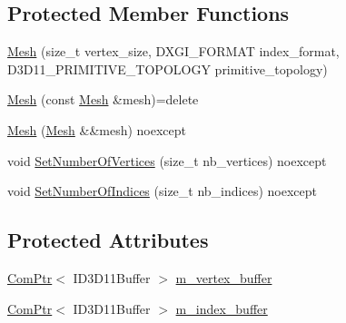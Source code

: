 \subsection*{Protected Member Functions}
\begin{DoxyCompactItemize}
\item 
\hyperlink{classmage_1_1rendering_1_1_mesh_a3113bd0dd48a82ae03e0a07d971494da}{Mesh} (size\+\_\+t vertex\+\_\+size, D\+X\+G\+I\+\_\+\+F\+O\+R\+M\+AT index\+\_\+format, D3\+D11\+\_\+\+P\+R\+I\+M\+I\+T\+I\+V\+E\+\_\+\+T\+O\+P\+O\+L\+O\+GY primitive\+\_\+topology)
\item 
\hyperlink{classmage_1_1rendering_1_1_mesh_a42e4cab2db663fa8d7f2c8651f30894b}{Mesh} (const \hyperlink{classmage_1_1rendering_1_1_mesh}{Mesh} \&mesh)=delete
\item 
\hyperlink{classmage_1_1rendering_1_1_mesh_aeb090ec9531823157f010a70a9dabf45}{Mesh} (\hyperlink{classmage_1_1rendering_1_1_mesh}{Mesh} \&\&mesh) noexcept
\item 
void \hyperlink{classmage_1_1rendering_1_1_mesh_abf2fc84400607b6579028eff66eb179e}{Set\+Number\+Of\+Vertices} (size\+\_\+t nb\+\_\+vertices) noexcept
\item 
void \hyperlink{classmage_1_1rendering_1_1_mesh_acd34fa8466235d5e17dd0f9be60fd5ea}{Set\+Number\+Of\+Indices} (size\+\_\+t nb\+\_\+indices) noexcept
\end{DoxyCompactItemize}
\subsection*{Protected Attributes}
\begin{DoxyCompactItemize}
\item 
\hyperlink{namespacemage_ae74f374780900893caa5555d1031fd79}{Com\+Ptr}$<$ I\+D3\+D11\+Buffer $>$ \hyperlink{classmage_1_1rendering_1_1_mesh_aa3cf2b0ad192e2b3b371655ee49eb4f4}{m\+\_\+vertex\+\_\+buffer}
\item 
\hyperlink{namespacemage_ae74f374780900893caa5555d1031fd79}{Com\+Ptr}$<$ I\+D3\+D11\+Buffer $>$ \hyperlink{classmage_1_1rendering_1_1_mesh_a113b12e839a22e62cb45991805586689}{m\+\_\+index\+\_\+buffer}
\end{DoxyCompactItemize}
